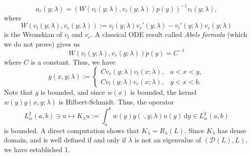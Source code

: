 \begin{Proof}
\begin{equation}\label{eq:sturm-liouville-green-right-coefficient}
a_r(y;\lambda)=(W(v_l(y;\lambda),v_r(y;\lambda))p(y))^{-1}v_l(y;\lambda),
\end{equation}
where
\begin{equation}\label{eq:sturm-liouville-fundamental-wronskian}
W(v_l(y;\lambda),v_r(y;\lambda)):=v_l(y;\lambda)v_r'(y;\lambda)-v_l'(y;\lambda)v_r(y;\lambda)
\end{equation}
is the Wronskian of $v_l$ and $v_r$. A classical ODE result called \emph{Abel\textquotesingle s formula} (which we do not prove) gives us
\begin{equation}\label{eq:sturm-liouville-abel-constant-wronskian}
W(v_l(y;\lambda),v_r(y;\lambda))p(y)=C^{-1}
\end{equation}
where $C$ is a constant. Thus, we have
\begin{equation}\label{eq:sturm-liouville-green-function-explicit-kernel}
g(x,y;\lambda):=\begin{cases}
Cv_r(y;\lambda)v_l(x;\lambda),&a<x<y,\\
Cv_l(y;\lambda)v_r(x;\lambda),&y<x<b.
\end{cases}
\end{equation}
Note that $g$ is bounded, and since $w(x)$ is bounded, the kernel $w(y)g(x,y;\lambda)$ is Hilbert-Schmidt. Thus, the operator
\begin{equation}\label{eq:sturm-liouville-weighted-green-resolvent-operator}
L_w^2(a,b)\ni u\mapsto K_\lambda u:=\int_a^bw(y)g(\cdot,y;\lambda)u(y)\,\mathrm{d}y\in L_w^2(a,b)
\end{equation}
is bounded. A direct computation shows that $K_\lambda=R_\lambda(L)$. Since $K_\lambda$ has dense domain, and is well defined if and only if $\lambda$ is not an eigenvalue of $(\mathcal{D}(L),L)$, we have established 1.


\end{Proof}
